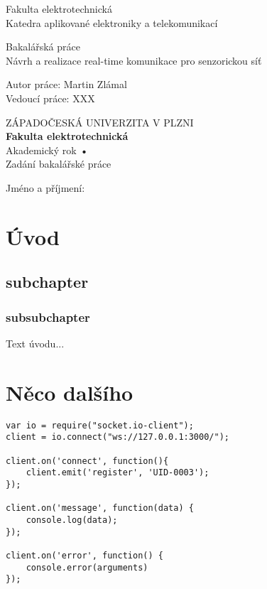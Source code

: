 \documentclass[oneside,12pt,a4paper,draft]{book}
\begin{document}
\pagestyle{empty}
\begin{titlepage}
Fakulta elektrotechnická \\
Katedra aplikované elektroniky a telekomunikací
\vspace{5cm}
\begin{center}
	{\Huge\sc Bakalářská práce} \\
	\vspace{1cm}
	{\large Návrh a realizace real-time komunikace pro senzorickou síť}
\end{center}
\vfill
Autor práce: Martin Zlámal\\
Vedoucí práce: XXX
\end{titlepage}

\pagestyle{empty}
\begin{titlepage}
\begin{center}
{\Large ZÁPADOČESKÁ UNIVERZITA V PLZNI} \\
\textbf{Fakulta elektrotechnická} \\
Akademický rok \textbf{•} \\
\vspace{2cm}
{\Huge\sc Zadání bakalářské práce} \\
\end{center}
\vspace{2cm}
Jméno a příjmení:
\end{titlepage}


%


\tableofcontents
\listoffigures
\listoftables

\chapter{Úvod}
\section{subchapter}
\subsection{subsubchapter}
Text úvodu...

\chapter{Něco dalšího}
\begin{verbatim}
var io = require("socket.io-client");
client = io.connect("ws://127.0.0.1:3000/");

client.on('connect', function(){
    client.emit('register', 'UID-0003');
});

client.on('message', function(data) {
    console.log(data);
});

client.on('error', function() {
    console.error(arguments)
});
\end{verbatim}

\end{document}
